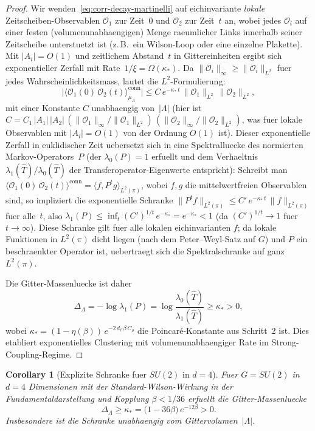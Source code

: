 \documentclass[12pt,a4paper]{article}
\theoremstyle{definition}
\theoremstyle{plain}
\newtheorem{corollary}[definition]{Corollary}
\theoremstyle{remark}
\begin{document}
\begin{proof}
Wir wenden~\eqref{eq:corr-decay-martinelli} auf eichinvariante \emph{lokale} Zeitscheiben-Observablen $\mathcal{O}_1$ zur Zeit~$0$ und $\mathcal{O}_2$ zur Zeit~$t$ an, wobei jedes $\mathcal{O}_i$ auf einer festen (volumenunabhaengigen) Menge raeumlicher Links innerhalb seiner Zeitscheibe unterstuetzt ist (z.\,B.\ ein Wilson-Loop oder eine einzelne Plakette). Mit $|A_i| = O(1)$ und zeitlichem Abstand~$t$ in Gittereinheiten ergibt sich exponentieller Zerfall mit Rate~$1/\xi = \Omega(\kappa_*)$. Da $\|\mathcal{O}_i\|_\infty \geq \|\mathcal{O}_i\|_{L^2}$ fuer jedes Wahrscheinlichkeitsmass, lautet die $L^2$-Formulierung:
\[
    \bigl|\langle \mathcal{O}_1(0)\,\mathcal{O}_2(t)\rangle_{\mu_\Lambda}^{\mathrm{conn}}\bigr|
    \leq C\,e^{-\kappa_*\,t}\,\|\mathcal{O}_1\|_{L^2}\,\|\mathcal{O}_2\|_{L^2},
\]
mit einer Konstante $C$ unabhaengig von~$|\Lambda|$ (hier ist $C = C_1\,|A_1|\,|A_2|\,(\|\mathcal{O}_1\|_\infty/\|\mathcal{O}_1\|_{L^2})\,(\|\mathcal{O}_2\|_\infty/\|\mathcal{O}_2\|_{L^2})$, was fuer lokale Observablen mit $|A_i| = O(1)$ von der Ordnung $O(1)$ ist). Dieser exponentielle Zerfall in euklidischer Zeit uebersetzt sich in eine Spektralluecke des normierten Markov-Operators~$P$ (der $\lambda_0(P) = 1$ erfuellt und dem Verhaeltnis $\lambda_1(\hat{T})/\lambda_0(\hat{T})$ der Transferoperator-Eigenwerte entspricht): Schreibt man $\langle \mathcal{O}_1(0)\,\mathcal{O}_2(t)\rangle^{\mathrm{conn}} = \langle f, P^t g\rangle_{L^2(\pi)}$, wobei $f, g$ die mittelwertfreien Observablen sind, so impliziert die exponentielle Schranke $\|P^t f\|_{L^2(\pi)} \leq C'\,e^{-\kappa_*\,t}\,\|f\|_{L^2(\pi)}$ fuer alle~$t$, also $\lambda_1(P) \leq \inf_t (C')^{1/t}\,e^{-\kappa_*} = e^{-\kappa_*} < 1$ (da $(C')^{1/t} \to 1$ fuer $t \to \infty$). Diese Schranke gilt fuer alle lokalen eichinvarianten $f$; da lokale Funktionen in $L^2(\pi)$ dicht liegen (nach dem Peter--Weyl-Satz auf $G$) und $P$ ein beschraenkter Operator ist, uebertraegt sich die Spektralschranke auf ganz~$L^2(\pi)$.

Die Gitter-Massenluecke ist daher
\begin{equation}
    \Delta_\Lambda = -\log\lambda_1(P) = \log\frac{\lambda_0(\hat{T})}{\lambda_1(\hat{T})} \geq \kappa_* > 0,
\end{equation}
wobei $\kappa_* = (1 - \eta(\beta))\,e^{-2\,d_\ell\,\beta\,C_\rho}$ die Poincar\'e-Konstante aus Schritt~2 ist.
Dies etabliert exponentielles Clustering mit volumenunabhaengiger Rate im Strong-Coupling-Regime.
\end{proof}

\begin{corollary}[Explizite Schranke fuer $SU(2)$ in $d=4$]
\label{cor:su2-explicit}
Fuer $G = SU(2)$ in $d = 4$ Dimensionen mit der Standard-Wilson-Wirkung in der Fundamentaldarstellung und Kopplung $\beta < 1/36$ erfuellt die Gitter-Massenluecke
\begin{equation}\label{eq:su2-gap}
    \Delta_\Lambda \geq \kappa_* = \bigl(1 - 36\beta\bigr)\,e^{-12\beta} > 0.
\end{equation}
Insbesondere ist die Schranke unabhaengig vom Gittervolumen~$|\Lambda|$.
\end{corollary}
\end{document}
